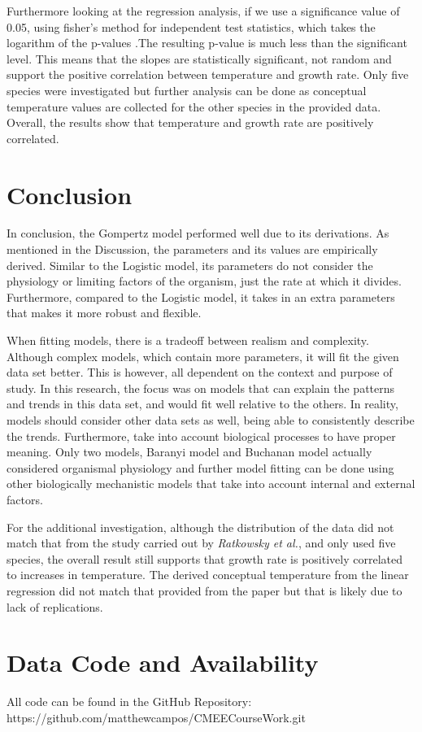\documentclass[11pt]{article}
\begin{document}
Furthermore looking at the regression analysis, if we use a significance value of 0.05, using fisher’s method for independent test statistics, which takes the logarithm of the p-values \cite[p.103]{fisher1992statistical}.The resulting p-value is much less than the significant level. This means that the slopes are statistically significant, not random and support the positive correlation between temperature and growth rate. Only five species were investigated but further analysis can be done as conceptual temperature values are collected for the other species in the provided data. Overall, the results show that temperature and growth rate are positively correlated.

\section{Conclusion}
In conclusion, the Gompertz model performed well due to its derivations. As mentioned in the Discussion, the parameters and its values are empirically derived. Similar to the Logistic model, its parameters do not consider the physiology or limiting factors of the organism, just the rate at which it divides. Furthermore, compared to the Logistic model, it takes in an extra parameters that makes it more robust and flexible.

When fitting models, there is a tradeoff between realism and complexity. Although complex models, which contain more parameters, it will fit the given data set better. This is however, all dependent on the context and purpose of study. In this research, the focus was on  models that can explain the patterns and trends in this data set, and would fit well relative to the others. In reality, models should consider other data sets as well, being able to consistently describe the trends. Furthermore, take into account biological processes to have proper meaning. Only two models, Baranyi model and Buchanan model actually considered organismal physiology and further model fitting can be done using other biologically mechanistic models that take into account internal and external factors.

For the additional investigation, although the distribution of the data did not match that from the study carried out by \textit{Ratkowsky et al.}, and only used five species, the overall result still supports that growth rate is positively correlated to increases in temperature. The derived conceptual temperature from the linear regression did not match that provided from the paper but that is likely due to lack of replications.

\newpage

\section{Data Code and Availability}
All code can be found in the GitHub Repository:\\
{https://github.com/matthewcampos/CMEECourseWork.git}

\newpage



\end{document}
